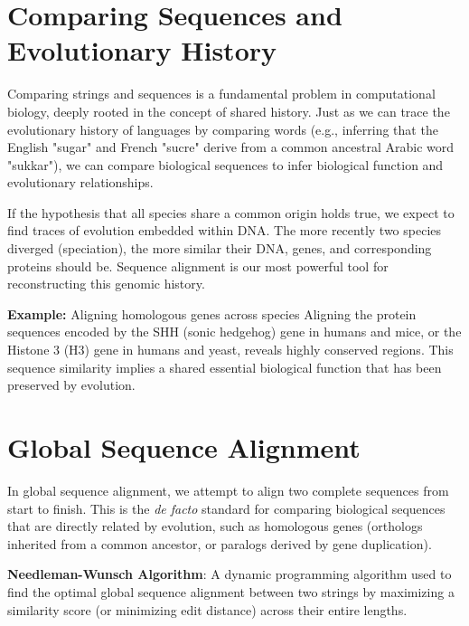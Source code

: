 \documentclass[11pt,a4paper]{article}
\begin{document}

\section{Comparing Sequences and Evolutionary History}
Comparing strings and sequences is a fundamental problem in computational biology, deeply rooted in the concept of shared history. Just as we can trace the evolutionary history of languages by comparing words (e.g., inferring that the English "sugar" and French "sucre" derive from a common ancestral Arabic word "sukkar"), we can compare biological sequences to infer biological function and evolutionary relationships. 


If the hypothesis that all species share a common origin holds true, we expect to find traces of evolution embedded within DNA. The more recently two species diverged (speciation), the more similar their DNA, genes, and corresponding proteins should be. Sequence alignment is our most powerful tool for reconstructing this genomic history.

\textbf{Example:} Aligning homologous genes across species
Aligning the protein sequences encoded by the SHH (sonic hedgehog) gene in humans and mice, or the Histone 3 (H3) gene in humans and yeast, reveals highly conserved regions. This sequence similarity implies a shared essential biological function that has been preserved by evolution.

\section{Global Sequence Alignment}
In global sequence alignment, we attempt to align two complete sequences from start to finish. This is the \textit{de facto} standard for comparing biological sequences that are directly related by evolution, such as homologous genes (orthologs inherited from a common ancestor, or paralogs derived by gene duplication).

\begin{important}
    \textbf{Needleman-Wunsch Algorithm}: A dynamic programming algorithm used to find the optimal global sequence alignment between two strings by maximizing a similarity score (or minimizing edit distance) across their entire lengths.
\end{important}
\end{document}

